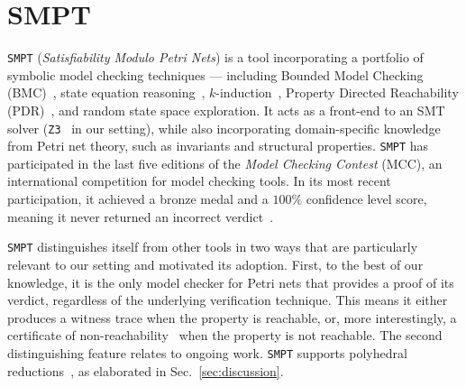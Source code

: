 

\section{SMPT}
\label{appendix:smpt}



\texttt{SMPT} (\emph{Satisfiability Modulo Petri Nets}) is a tool incorporating a portfolio of symbolic model checking techniques --- including Bounded Model Checking (BMC)~\cite{BiCiClZh99}, state equation reasoning~\cite{Mu77}, $k$-induction~\cite{ShSiSt20}, Property Directed Reachability (PDR)~\cite{Br11,AmDaHu22}, and random state space exploration. It acts as a front-end to an SMT solver (\texttt{Z3}~\cite{DeBj08} in our setting), while also incorporating domain-specific knowledge from Petri net theory, such as invariants and structural properties. \texttt{SMPT} has participated in the last five editions of the \textit{Model Checking Contest} (MCC), an international competition for model checking tools. In its most recent participation, it achieved a bronze medal and a $100\%$ confidence level score, meaning it never returned an incorrect verdict~\cite{mcc:2025}.

\texttt{SMPT} distinguishes itself from other tools in two ways that are particularly relevant to our setting and motivated its adoption. First, to the best of our knowledge, it is the only model checker for Petri nets that provides a proof of its verdict, regardless of the underlying verification technique. This means it either produces a witness trace when the property is reachable, or, more interestingly, a certificate of non-reachability~\cite{AmDaHu22} when the property is not reachable.
%
The second distinguishing feature relates to ongoing work. \texttt{SMPT} supports polyhedral reductions~\cite{AmBeDa21}, as elaborated in Sec.~\ref{sec:discussion}.



